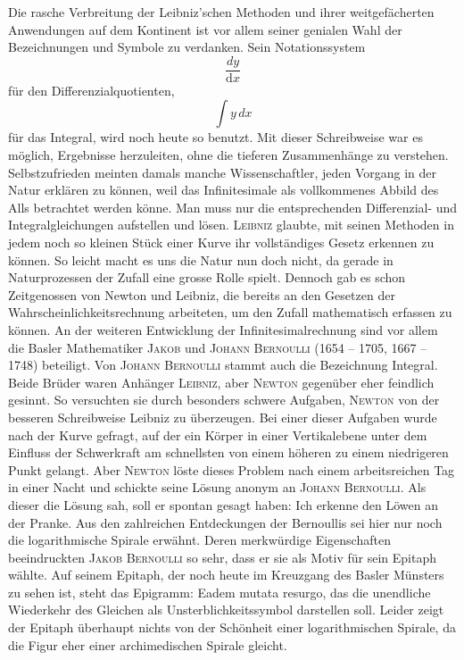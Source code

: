 \documentclass[%
11pt,%
twoside,%
titlepage,%
german,%
headsepline%
]{scrartcl}
\begin{document}
Die rasche Verbreitung der Leibniz'schen Methoden und ihrer weitgef\"acherten Anwendungen auf dem Kontinent ist vor allem seiner genialen Wahl der Bezeichnungen und Symbole zu verdanken. Sein Notationssystem
$$\frac{dy}{\mathrm{d}x}$$
f\"ur den Differenzialquotienten,
$$\int y\,dx$$
f\"ur das Integral, wird noch heute so benutzt. Mit dieser Schreibweise war es m\"oglich, Ergebnisse herzuleiten, ohne die tieferen Zusammenh\"ange zu verstehen.
Selbstzufrieden meinten damals manche Wissenschaftler, jeden Vorgang in der Natur erkl\"aren zu k\"onnen, weil das Infinitesimale als vollkommenes Abbild des Alls betrachtet werden k\"onne. Man muss nur die entsprechenden Differenzial- und Integralgleichungen aufstellen und l\"osen. \textsc{Leibniz} glaubte, mit seinen Methoden in jedem noch so kleinen St\"uck einer Kurve ihr vollst\"andiges Gesetz erkennen zu k\"onnen.
So leicht macht es uns die Natur nun doch nicht, da gerade in Naturprozessen der Zufall eine grosse Rolle spielt. Dennoch gab es schon Zeitgenossen von Newton und Leibniz, die bereits an den Gesetzen der Wahrscheinlichkeitsrechnung arbeiteten, um den Zufall mathematisch erfassen zu k\"onnen.
An der weiteren Entwicklung der Infinitesimalrechnung sind vor allem die Basler Mathematiker \textsc{Jakob} und \textsc{Johann Bernoulli} (1654 -- 1705, 1667 -- 1748) beteiligt. Von \textsc{Johann Bernoulli} stammt auch die Bezeichnung \glqq Integral\grqq. Beide Br\"uder waren Anh\"anger \textsc{Leibniz}, aber \textsc{Newton} gegen\"uber eher feindlich gesinnt. So versuchten sie durch besonders schwere Aufgaben, \textsc{Newton} von der besseren Schreibweise Leibniz zu \"uberzeugen. Bei einer dieser Aufgaben wurde nach der Kurve gefragt, auf der ein K\"orper in einer Vertikalebene unter dem Einfluss der Schwerkraft am schnellsten von einem h\"oheren zu einem niedrigeren Punkt gelangt. Aber \textsc{Newton} l\"oste dieses Problem nach einem arbeitsreichen Tag in einer Nacht und schickte seine L\"osung anonym an \textsc{Johann Bernoulli}. Als dieser die L\"osung sah, soll er spontan gesagt haben: \glqq Ich erkenne den L\"owen an der Pranke.\grqq
Aus den zahlreichen Entdeckungen der Bernoullis sei hier nur noch die logarithmische Spirale erw\"ahnt. Deren merkw\"urdige Eigenschaften beeindruckten \textsc{Jakob Bernoulli} so sehr, dass er sie als Motiv f\"ur sein Epitaph w\"ahlte. Auf seinem Epitaph, der noch heute im Kreuzgang des Basler M\"unsters zu sehen ist, steht das Epigramm: \glqq Eadem mutata resurgo\grqq, das die unendliche Wiederkehr des Gleichen als Unsterblichkeitssymbol darstellen soll. Leider zeigt der Epitaph \"uberhaupt nichts von der Sch\"onheit einer logarithmischen Spirale, da die Figur eher einer archimedischen Spirale gleicht.
\end{document}
